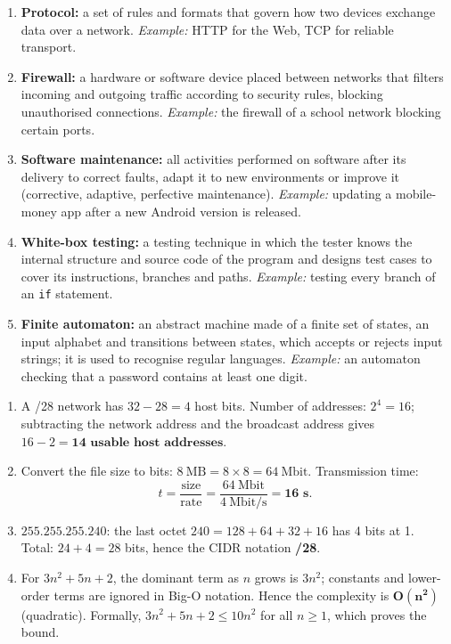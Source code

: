 \documentclass[11pt]{article}
\begin{document}
\begin{corrige}
\begin{enumerate}
\item \textbf{Protocol:} a set of rules and formats that govern how two devices exchange data over a network. \emph{Example:} HTTP for the Web, TCP for reliable transport.
\item \textbf{Firewall:} a hardware or software device placed between networks that filters incoming and outgoing traffic according to security rules, blocking unauthorised connections. \emph{Example:} the firewall of a school network blocking certain ports.
\item \textbf{Software maintenance:} all activities performed on software after its delivery to correct faults, adapt it to new environments or improve it (corrective, adaptive, perfective maintenance). \emph{Example:} updating a mobile-money app after a new Android version is released.
\item \textbf{White-box testing:} a testing technique in which the tester knows the internal structure and source code of the program and designs test cases to cover its instructions, branches and paths. \emph{Example:} testing every branch of an \texttt{if} statement.
\item \textbf{Finite automaton:} an abstract machine made of a finite set of states, an input alphabet and transitions between states, which accepts or rejects input strings; it is used to recognise regular languages. \emph{Example:} an automaton checking that a password contains at least one digit.
\end{enumerate}
\end{corrige}

\begin{corrige}
\begin{enumerate}
\item A /28 network has $32-28 = 4$ host bits. Number of addresses: $2^4 = 16$; subtracting the network address and the broadcast address gives $16 - 2 = \textbf{14 usable host addresses}$.
\item Convert the file size to bits: $8\ \text{MB} = 8 \times 8 = 64\ \text{Mbit}$. Transmission time:
\[ t = \dfrac{\text{size}}{\text{rate}} = \dfrac{64\ \text{Mbit}}{4\ \text{Mbit/s}} = \textbf{16 s}. \]
\item $255.255.255.240$: the last octet $240 = 128+64+32+16$ has 4 bits at 1. Total: $24 + 4 = 28$ bits, hence the CIDR notation \textbf{/28}.
\item For $3n^2 + 5n + 2$, the dominant term as $n$ grows is $3n^2$; constants and lower-order terms are ignored in Big-O notation. Hence the complexity is $\boldsymbol{O(n^2)}$ (quadratic). Formally, $3n^2+5n+2 \le 10n^2$ for all $n \ge 1$, which proves the bound.
\end{enumerate}
\end{corrige}
\end{document}
